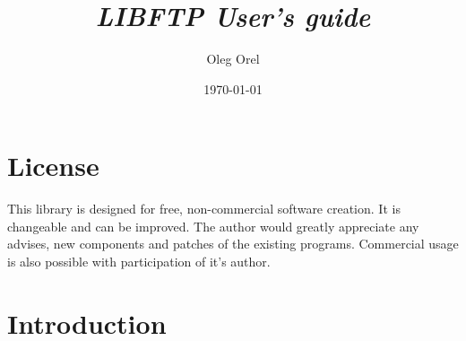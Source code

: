 \pagestyle{empty}
\pagestyle{fancyplain}
\newcommand{\tit}[1]{#1}
\rhead[\fancyplain{}{\tit{\leftmark}}]{\fancyplain{}{\tit{\rightmark}}}
\lhead[\fancyplain{}{\tit{\rightmark}}]{\fancyplain{}{\tit{\leftmark}}}
\chead{\hfill}
\lfoot[\fancyplain{}{\tit{\thepage}}]{\fancyplain{}{\hfill}}
\rfoot[\fancyplain{}{\hfill}]{\fancyplain{}{\tit{\thepage}}}
\cfoot{\hfill}
\renewcommand{\sectionmark}[1]{\markboth{#1}{\ }}
\renewcommand{\subsectionmark}[1]{\markright{\ }}
\newcommand{\look}[1]{(Chapter~\ref{#1}, page~\pageref{#1})}
\newcommand{\toindex}[1]{\underline{\bf#1}\index{#1}}
\newcommand{\add}[1]{\symbol{64}}
\newcommand{\ps}[1]{\symbol{37}s}
\newcommand{\twcol}[4]{
\noindent\parbox[t]{#1\textwidth}{#3} \hfill \parbox[t]{#2\textwidth}{#4\hfill}\\
}
\newcommand{\tc}[2]{\twcol{0.49}{0.49}{#1}{#2}}
\newcommand{\tcc}[2]{\twcol{0.49}{0.49}{\toindex{#1}}{#2}}
\newcommand{\ttt}[2]{\bigskip

{\bf#1}

#2}
\newcommand{\ts}[1]{{\underline{\bf#1}}}
\newcommand{\dl}[2]{\parbox[t]{0.4\textwidth}{#1\hfill}\hfill
                    \parbox[t]{0.4\textwidth}{#2\hfill}}
\makeindex
 
\title{\bf\it{LIBFTP User's guide}}
\author{Oleg Orel}
\date{\today}
\newpage
\maketitle

\section*{License}

This library is designed for free, non-commercial software creation. 
It is changeable and can be improved. The author would greatly appreciate 
any advises, new components and patches of the existing programs.
Commercial usage is also possible with participation of it's author.

\section*{Introduction}

